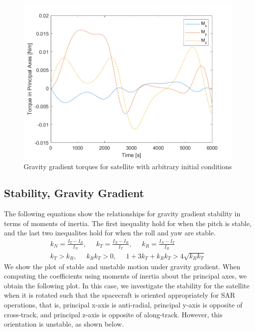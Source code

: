 \begin{figure}[H]
\centering
\includegraphics[scale=0.8]{Images/ps4_problem4e_torque.png}
\caption{Gravity gradient torques for satellite with arbitrary initial conditions}
\label{fig:ps4_problem4e_torque}
\end{figure}

\subsection{Stability, Gravity Gradient}

The following equations show the relationships for gravity gradient stability in terms of moments of inertia. The first inequality hold for when the pitch is stable, and the last two inequalites hold for when the roll and yaw are stable.
\begin{align*}
    k_N = \frac{I_T - I_R}{I_N}, \;\;\;\;\;
    k_T = \frac{I_N - I_R}{I_T}, \;\;\;\;\;
    k_R = \frac{I_N - I_T}{I_R} \\
    k_T > k_R, \;\;\;\;\;
    k_R k_T > 0, \;\;\;\;\;
    1 + 3 k_T + k_R k_T > 4 \sqrt{k_R k_T}
\end{align*}
We show the plot of stable and unstable motion under gravity gradient. When computing the coefficients using moments of inertia about the principal axes, we obtain the following plot. In this case, we investigate the stability for the satellite when it is rotated such that the spacecraft is oriented appropriately for SAR operations, that is, principal x-axis is anti-radial, principal y-axis is opposite of cross-track, and principal z-axis is opposite of along-track. However, this orientation is unstable, as shown below.

